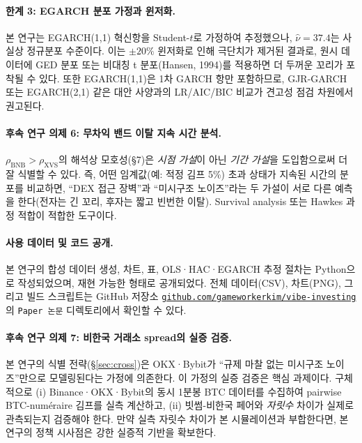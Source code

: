 \documentclass[11pt,a4paper]{article}
\begin{document}
\paragraph{한계 3: EGARCH 분포 가정과 윈저화.}
본 연구는 EGARCH(1,1) 혁신항을 Student-$t$로 가정하여 추정했으나, $\hat\nu=37.4$는
사실상 정규분포 수준이다. 이는 $\pm20\%$ 윈저화로 인해 극단치가 제거된 결과로,
원시 데이터에 GED 분포 또는 비대칭 t 분포(Hansen, 1994)를 적용하면 더 두꺼운 꼬리가
포착될 수 있다. 또한 EGARCH(1,1)은 1차 GARCH 항만 포함하므로, GJR-GARCH 또는 EGARCH(2,1)
같은 대안 사양과의 LR/AIC/BIC 비교가 견고성 점검 차원에서 권고된다.

\paragraph{후속 연구 의제 6: 무차익 밴드 이탈 지속 시간 분석.}
$\rho_{\text{BNB}}>\rho_{\text{XVS}}$의 해석상 모호성(§7)은
\emph{시점 가설}이 아닌 \emph{기간 가설}을 도입함으로써 더 잘 식별할 수 있다.
즉, 어떤 임계값(예: 적정 김프 5\%) 초과 상태가 지속된 시간의 분포를 비교하면,
``DEX 접근 장벽''과 ``미시구조 노이즈''라는 두 가설이 서로 다른 예측을 한다(전자는 긴 꼬리,
후자는 짧고 빈번한 이탈). Survival analysis 또는 Hawkes 과정 적합이 적합한 도구이다.

\paragraph{사용 데이터 및 코드 공개.}
본 연구의 합성 데이터 생성, 차트, 표, OLS·HAC·EGARCH 추정 절차는 Python으로 작성되었으며,
재현 가능한 형태로 공개되었다. 전체 데이터(CSV), 차트(PNG), 그리고 빌드 스크립트는
GitHub 저장소 \href{https://github.com/gameworkerkim/vibe-investing/tree/main/Paper\%20\%EB\%85\%BC\%EB\%AC\%B8}%
{\texttt{github.com/gameworkerkim/vibe-investing}}의 \texttt{Paper 논문} 디렉토리에서 확인할 수 있다.



\paragraph{후속 연구 의제 7: 비한국 거래소 spread의 실증 검증.}
본 연구의 식별 전략(\S\ref{sec:cross})은 OKX·Bybit가 ``규제 마찰 없는 미시구조 노이즈''만으로
모델링된다는 가정에 의존한다. 이 가정의 실증 검증은 핵심 과제이다. 구체적으로
(i) Binance·OKX·Bybit의 동시 1분봉 BTC 데이터를 수집하여 pairwise BTC-num\'eraire 김프를
실측 계산하고, (ii) 빗썸-비한국 페어와 \emph{자릿수} 차이가 실제로 관측되는지 검증해야 한다.
만약 실측 자릿수 차이가 본 시뮬레이션과 부합한다면, 본 연구의 정책 시사점은 강한 실증적
기반을 확보한다.
\end{document}
